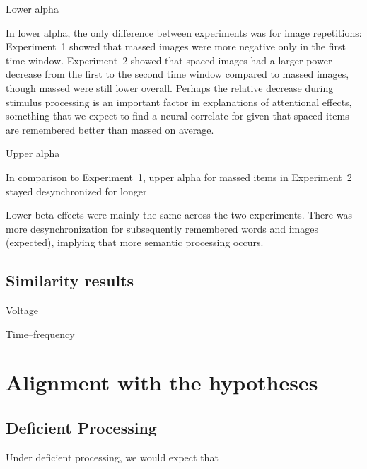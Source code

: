 Lower alpha

In lower alpha, the only difference between experiments was for image repetitions: Experiment~1 showed that massed images were more negative only in the first time window.  Experiment~2 showed that spaced images had a larger power decrease from the first to the second time window compared to massed images, though massed were still lower overall.  Perhaps the relative decrease during stimulus processing is an important factor in explanations of attentional effects, something that we expect to find a neural correlate for given that spaced items are remembered better than massed on average.


Upper alpha

In comparison to Experiment~1, upper alpha for massed items in Experiment~2 stayed desynchronized for longer


Lower beta effects were mainly the same across the two experiments.  There was more desynchronization for subsequently remembered words and images (expected), implying that more semantic processing occurs.

\subsection{Similarity results}


Voltage


Time--frequency


\section{Alignment with the hypotheses}


\subsection{Deficient Processing}

Under deficient processing, we would expect that


